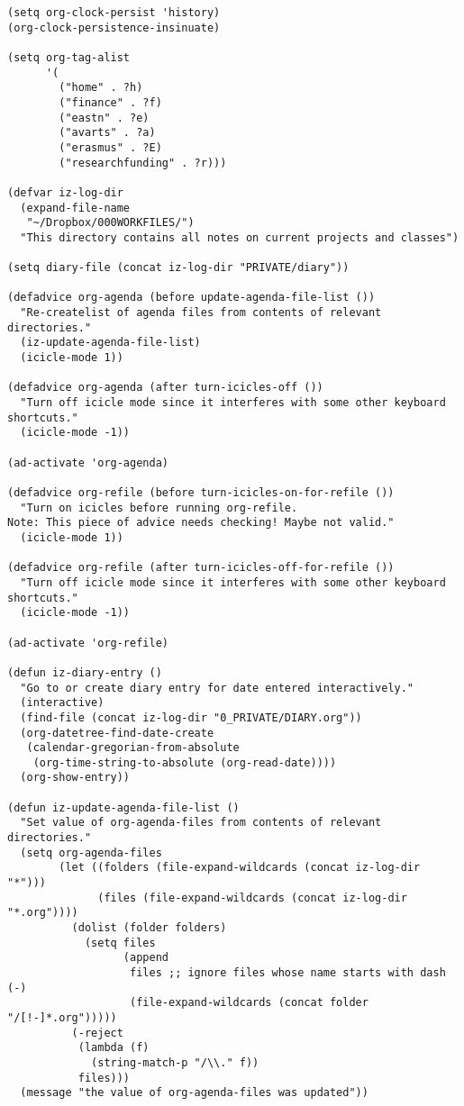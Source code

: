 \documentclass[nofonts]{tufte-handout}
\begin{document}
\begin{verbatim}
(setq org-clock-persist 'history)
(org-clock-persistence-insinuate)

(setq org-tag-alist
      '(
        ("home" . ?h)
        ("finance" . ?f)
        ("eastn" . ?e)
        ("avarts" . ?a)
        ("erasmus" . ?E)
        ("researchfunding" . ?r)))

(defvar iz-log-dir
  (expand-file-name
   "~/Dropbox/000WORKFILES/")
  "This directory contains all notes on current projects and classes")

(setq diary-file (concat iz-log-dir "PRIVATE/diary"))

(defadvice org-agenda (before update-agenda-file-list ())
  "Re-createlist of agenda files from contents of relevant directories."
  (iz-update-agenda-file-list)
  (icicle-mode 1))

(defadvice org-agenda (after turn-icicles-off ())
  "Turn off icicle mode since it interferes with some other keyboard shortcuts."
  (icicle-mode -1))

(ad-activate 'org-agenda)

(defadvice org-refile (before turn-icicles-on-for-refile ())
  "Turn on icicles before running org-refile.
Note: This piece of advice needs checking! Maybe not valid."
  (icicle-mode 1))

(defadvice org-refile (after turn-icicles-off-for-refile ())
  "Turn off icicle mode since it interferes with some other keyboard shortcuts."
  (icicle-mode -1))

(ad-activate 'org-refile)

(defun iz-diary-entry ()
  "Go to or create diary entry for date entered interactively."
  (interactive)
  (find-file (concat iz-log-dir "0_PRIVATE/DIARY.org"))
  (org-datetree-find-date-create
   (calendar-gregorian-from-absolute
    (org-time-string-to-absolute (org-read-date))))
  (org-show-entry))

(defun iz-update-agenda-file-list ()
  "Set value of org-agenda-files from contents of relevant directories."
  (setq org-agenda-files
        (let ((folders (file-expand-wildcards (concat iz-log-dir "*")))
              (files (file-expand-wildcards (concat iz-log-dir "*.org"))))
          (dolist (folder folders)
            (setq files
                  (append
                   files ;; ignore files whose name starts with dash (-)
                   (file-expand-wildcards (concat folder "/[!-]*.org")))))
          (-reject
           (lambda (f)
             (string-match-p "/\\." f))
           files)))
  (message "the value of org-agenda-files was updated"))


\end{verbatim}
\end{document}
